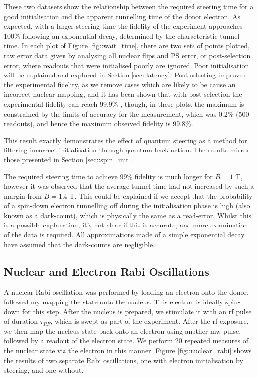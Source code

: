 	These two datasets show the relationship between the required steering time for a good initialisation and the apparent tunnelling time of the donor electron. As expected, with a larger steering time the fidelity of the experiment approaches 100\% following an exponential decay, determined by the characteristic tunnel time. In each plot of Figure \ref{fig::wait_time}, there are two sets of points plotted, raw error data given by analysing all nuclear flips and PS error, or post-selection error, where readouts that were initialised poorly are ignored. Poor initialisation will be explained and explored in \hyperref[sec::latency]{Section \ref{sec::latency}}. Post-selecting improves the experimental fidelity, as we remove cases which are likely to be cause an incorrect nuclear mapping, and it has been shown that with post-selection the experimental fidelity can reach 99.9\% , though, in these plots, the maximum is constrained by the limits of accuracy for the measurement, which was 0.2\% (500 readouts), and hence the maximum observed fidelity is 99.8\%.

	This result exactly demonstrates the effect of quantum steering as a method for filtering incorrect initialisation through quantum-back action. The results mirror those presented in Section \ref{sec::spin_init}.
	
	The required steering time to achieve 99\% fidelity is much longer for $B = 1$ T, however it was observed that the average tunnel time had not increased by such a margin from $B = 1.4$ T. This could be explained if we accept that the probability of a spin-down electron tunnelling off during the initialisation phase is high (also known as a dark-count), which is physically the same as a read-error. Whilst this is a possible explanation, it's not clear if this is accurate, and more examination of the data is required. All approximations made of a simple exponential decay have assumed that the dark-counts are negligible.

\subsection{Nuclear and Electron Rabi Oscillations}
	A nuclear Rabi oscillation was performed by loading an electron onto the donor, followed my mapping the state onto the nucleus. This electron is ideally spin-down for this step. After the nucleus is prepared, we stimulate it with an \gls{rf} pulse of duration $\tau_{RF}$, which is swept as part of the experiment. After the \gls{rf} exposure, we then map the nucleus state back onto an electron using another \gls{mw} pulse, followed by a readout of the electron state. We perform 20 repeated measures of the nuclear state via the electron in this manner. 	Figure \ref{fig::nuclear_rabi} shows the results of two separate Rabi oscillations, one with electron initialisation by steering, and one without.
	
